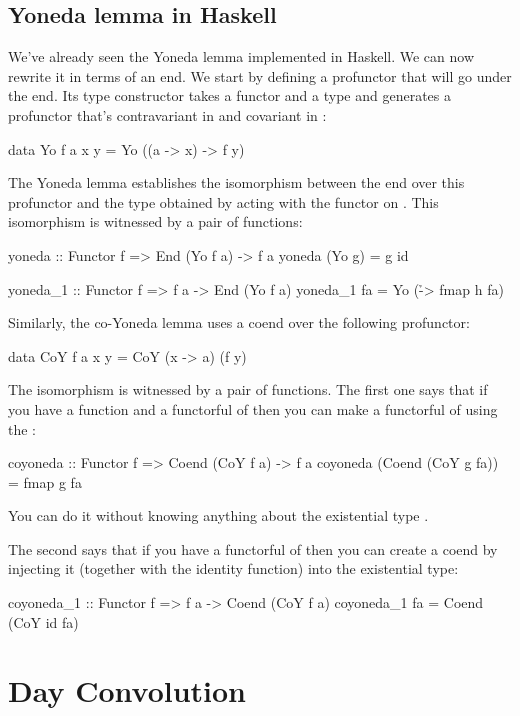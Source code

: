 \documentclass[DaoFP]{subfiles}
\begin{document}
\subsection{Yoneda lemma in Haskell}

We've already seen the Yoneda lemma implemented in Haskell. We can now rewrite it in terms of an end. We start by defining a profunctor that will go under the end. Its type constructor takes a functor  and a type  and generates a profunctor that's contravariant in  and covariant in :
\begin{haskell}
data Yo f a x y = Yo ((a -> x) -> f y)
\end{haskell}
The Yoneda lemma establishes the isomorphism between the end over this profunctor and the type obtained by acting with the functor   on . This isomorphism is witnessed by a pair of functions:
\begin{haskell}
yoneda :: Functor f => End (Yo f a) -> f a
yoneda (Yo g) = g id

yoneda_1 :: Functor f => f a -> End (Yo f a)
yoneda_1 fa = Yo (\h -> fmap h fa)
\end{haskell}

Similarly, the co-Yoneda lemma uses a coend over the following profunctor:
\begin{haskell}
data CoY f a x y = CoY (x -> a) (f y)
\end{haskell}
The isomorphism is witnessed by a pair of functions. The first one says that if you have a function  and a functorful of  then you can make a functorful of  using the :
\begin{haskell}
coyoneda :: Functor f => Coend (CoY f a) -> f a
coyoneda (Coend (CoY g fa)) = fmap g fa
\end{haskell}
You can do it without knowing anything about the existential type .

The second says that if you have a functorful of  then you can create a coend by injecting it (together with the identity function) into the existential type:
\begin{haskell}
coyoneda_1 :: Functor f => f a -> Coend (CoY f a)
coyoneda_1 fa = Coend (CoY id fa)
\end{haskell}

\section{Day Convolution}
\end{document}
